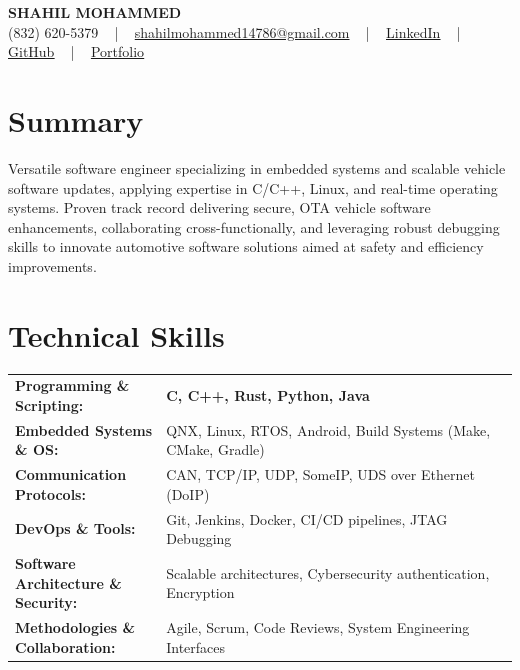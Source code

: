 \documentclass[letterpaper,11pt]{article}
\begin{document}
\begin{center}
    {\fontsize{14pt}{12pt}\selectfont \textbf{\MakeUppercase{Shahil Mohammed}}}\\ \vspace{2pt}
    \fontsize{10pt}{12pt}\selectfont (832) 620-5379 ~ | ~ \href{mailto:shahilmohammed14786@gmail.com}{shahilmohammed14786@gmail.com} ~ | ~  
    \href{https://www.linkedin.com/in/shahil-mohammed-9652931a1/}{\color{blue}\underline{LinkedIn}}  ~ | ~ 
    \href{https://github.com/freakbeast14}{\color{blue}\underline{GitHub}} ~ | ~ 
    \href{https://shahil-mohammed.netlify.app/}{\color{blue}\underline{Portfolio}}
    \vspace{-8pt}
\end{center}

\section{Summary}
\fontsize{9pt}{10pt}\selectfont
Versatile software engineer specializing in embedded systems and scalable vehicle software updates, applying expertise in C/C++, Linux, and real-time operating systems. Proven track record delivering secure, OTA vehicle software enhancements, collaborating cross-functionally, and leveraging robust debugging skills to innovate automotive software solutions aimed at safety and efficiency improvements.
 \vspace{-5pt}
 
\section{Technical Skills}
        \vspace{-14pt}
        \begin{table}[h]
            \fontsize{9pt}{10pt}\selectfont
            \begin{tabular}{p{0.3\linewidth} p{0.7\linewidth}}
                \textbf{Programming \& Scripting:} & \textbf{C, C++, Rust, Python, Java} \\
                \textbf{Embedded Systems \& OS:} & QNX, Linux, RTOS, Android, Build Systems (Make, CMake, Gradle) \\
                \textbf{Communication Protocols:} & CAN, TCP/IP, UDP, SomeIP, UDS over Ethernet (DoIP) \\
                \textbf{DevOps \& Tools:} & Git, Jenkins, Docker, CI/CD pipelines, JTAG Debugging \\
                \textbf{Software Architecture \& Security:} & Scalable architectures, Cybersecurity authentication, Encryption \\
                \textbf{Methodologies \& Collaboration:} & Agile, Scrum, Code Reviews, System Engineering Interfaces \\
            \end{tabular}
        \end{table}
 \vspace{-15pt}
 
\end{document}
